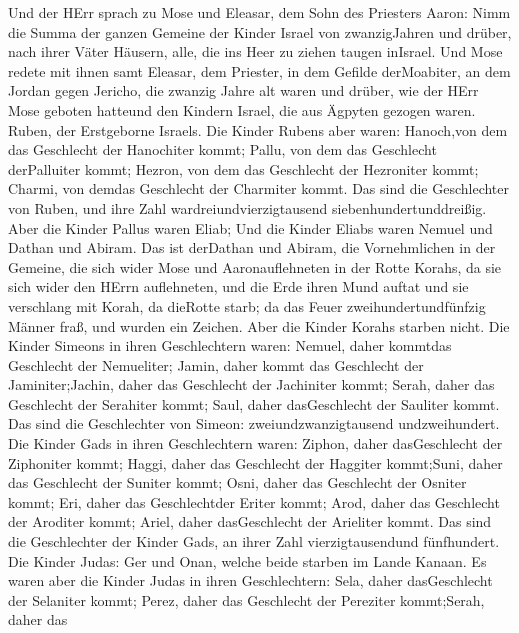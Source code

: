  Und der HErr sprach zu Mose und Eleasar, dem Sohn des
Priesters Aaron:  Nimm die Summa der ganzen Gemeine der
Kinder Israel von zwanzigJahren und drüber, nach ihrer Väter Häusern,
alle, die ins Heer zu ziehen taugen inIsrael.  Und Mose
redete mit ihnen samt Eleasar, dem Priester, in dem Gefilde derMoabiter,
an dem Jordan gegen Jericho,  die zwanzig Jahre alt waren
und drüber, wie der HErr Mose geboten hatteund den Kindern Israel, die
aus Ägpyten gezogen waren.  Ruben, der Erstgeborne Israels.
Die Kinder Rubens aber waren: Hanoch,von dem das Geschlecht der
Hanochiter kommt; Pallu, von dem das Geschlecht derPalluiter kommt;
 Hezron, von dem das Geschlecht der Hezroniter kommt;
Charmi, von demdas Geschlecht der Charmiter kommt.  Das sind
die Geschlechter von Ruben, und ihre Zahl wardreiundvierzigtausend
siebenhundertunddreißig.  Aber die Kinder Pallus waren
Eliab;  Und die Kinder Eliabs waren Nemuel und Dathan und
Abiram. Das ist derDathan und Abiram, die Vornehmlichen in der Gemeine,
die sich wider Mose und Aaronauflehneten in der Rotte Korahs, da sie
sich wider den HErrn auflehneten,  und die Erde ihren Mund
auftat und sie verschlang mit Korah, da dieRotte starb; da das Feuer
zweihundertundfünfzig Männer fraß, und wurden ein Zeichen. 
Aber die Kinder Korahs starben nicht.  Die Kinder Simeons
in ihren Geschlechtern waren: Nemuel, daher kommtdas Geschlecht der
Nemueliter; Jamin, daher kommt das Geschlecht der Jaminiter;Jachin,
daher das Geschlecht der Jachiniter kommt;  Serah, daher
das Geschlecht der Serahiter kommt; Saul, daher dasGeschlecht der
Sauliter kommt.  Das sind die Geschlechter von Simeon:
zweiundzwanzigtausend undzweihundert.  Die Kinder Gads in
ihren Geschlechtern waren: Ziphon, daher dasGeschlecht der Ziphoniter
kommt; Haggi, daher das Geschlecht der Haggiter kommt;Suni, daher das
Geschlecht der Suniter kommt;  Osni, daher das Geschlecht
der Osniter kommt; Eri, daher das Geschlechtder Eriter kommt;
 Arod, daher das Geschlecht der Aroditer kommt; Ariel,
daher dasGeschlecht der Arieliter kommt.  Das sind die
Geschlechter der Kinder Gads, an ihrer Zahl vierzigtausendund
fünfhundert.  Die Kinder Judas: Ger und Onan, welche beide
starben im Lande Kanaan.  Es waren aber die Kinder Judas in
ihren Geschlechtern: Sela, daher dasGeschlecht der Selaniter kommt;
Perez, daher das Geschlecht der Pereziter kommt;Serah, daher das
